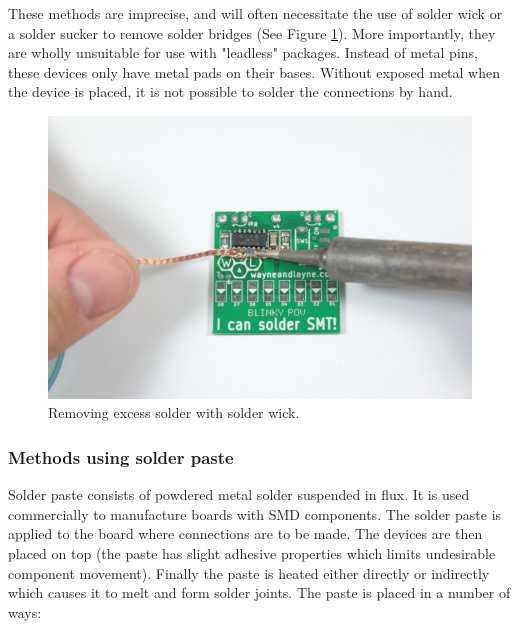 These methods are imprecise, and will often necessitate the use of solder wick or a solder sucker to remove solder bridges (See Figure \ref{handsolder}). More importantly, they are wholly unsuitable
for use with "leadless" packages. Instead of metal pins, these devices only have metal pads on their bases. Without exposed metal when the device is placed, it is not possible
to solder the connections by hand.

\begin{figure}[ht!]
\centering
\includegraphics[width=120mm]{resources/handsoldering.jpg}
\caption{Removing excess solder with solder wick.}
\label{handsolder}
\end{figure}

\subsubsection{Methods using solder paste}

Solder paste consists of powdered metal solder suspended in flux. It is used commercially to manufacture boards with SMD components. The solder paste is applied to the board where
connections are to be made. The devices are then placed on top (the paste has slight adhesive properties which limits undesirable component movement). Finally the paste is heated either directly
or indirectly which causes it to melt and form solder joints. The paste is placed in a number of ways:

